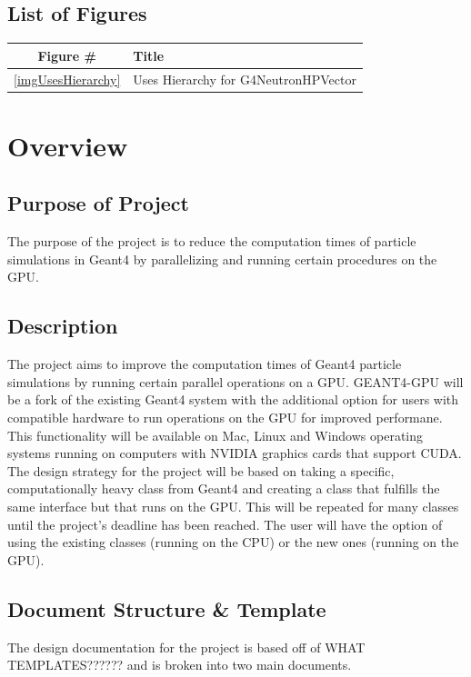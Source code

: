 \documentclass[12pt]{article}
\begin{document}
\subsection{List of Figures}
\begin{center}
\begin{tabular}{cl}
\toprule
\bf Figure \# & \bf Title\\\midrule
\ref{imgUsesHierarchy} & Uses Hierarchy for G4NeutronHPVector\\
\bottomrule
\end{tabular}
\end{center}

\section{Overview}
\subsection{Purpose of Project}
The purpose of the project is to reduce the computation times of particle simulations in Geant4 by parallelizing and running certain procedures on the GPU.

\subsection{Description}
The project aims to improve the computation times of Geant4 particle simulations by running certain parallel operations on a GPU. GEANT4-GPU will be a fork of the existing Geant4 system with the additional option for users with compatible hardware to run operations on the GPU for improved performane. This functionality will be available on Mac, Linux and Windows operating systems running on computers with NVIDIA graphics cards that support CUDA.\\

The design strategy for the project will be based on taking a specific, computationally heavy class from Geant4 and creating a class that fulfills the same interface but that runs on the GPU. This will be repeated for many classes until the project's deadline has been reached. The user will have the option of using the existing classes (running on the CPU) or the new ones (running on the GPU).

\subsection{Document Structure \& Template}
The design documentation for the project is based off of WHAT TEMPLATES?????? and is broken into two main documents.\\
\end{document}
